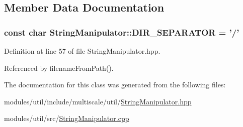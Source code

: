 \subsection{Member Data Documentation}
\hypertarget{classmultiscale_1_1StringManipulator_a3c975968005d8db010415d240b02b5db}{
\subsubsection[{D\-I\-R\-\_\-\-S\-E\-P\-A\-R\-A\-T\-O\-R}]{\setlength{\rightskip}{0pt plus 5cm}const char String\-Manipulator\-::\-D\-I\-R\-\_\-\-S\-E\-P\-A\-R\-A\-T\-O\-R = '/'\hspace{0.3cm}{\ttfamily [static]}}}\label{classmultiscale_1_1StringManipulator_a3c975968005d8db010415d240b02b5db}


Definition at line 57 of file String\-Manipulator.\-hpp.



Referenced by filename\-From\-Path().



The documentation for this class was generated from the following files\-:\begin{DoxyCompactItemize}
\item 
modules/util/include/multiscale/util/\hyperlink{StringManipulator_8hpp}{String\-Manipulator.\-hpp}\item 
modules/util/src/\hyperlink{StringManipulator_8cpp}{String\-Manipulator.\-cpp}\end{DoxyCompactItemize}
